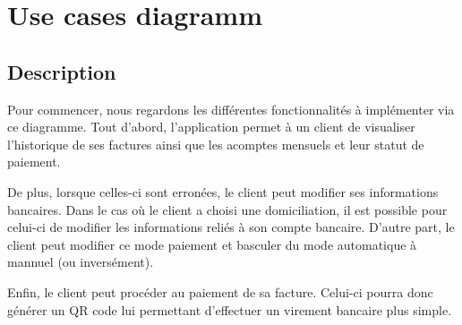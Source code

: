 \section{Use cases diagramm}
\subsection{Description}
\begin{flushleft}
Pour commencer, nous regardons les différentes fonctionnalités à implémenter via ce diagramme. Tout d'abord, l'application permet à un client de visualiser l'historique de ses factures ainsi que les acomptes mensuels et leur statut de paiement.
\end{flushleft}


\begin{flushleft}
De plus, lorsque celles-ci sont erronées, le client peut modifier ses informations bancaires. Dans le cas où le client a choisi une domiciliation, il est possible pour celui-ci de modifier les informations reliés à son compte bancaire.
D'autre part, le client peut modifier ce mode paiement et basculer du mode automatique à mannuel (ou inversément).
\end{flushleft}

\begin{flushleft}
Enfin, le client peut procéder au paiement de sa facture. Celui-ci pourra donc générer un QR code lui permettant d'effectuer un virement bancaire plus simple.
\end{flushleft}

